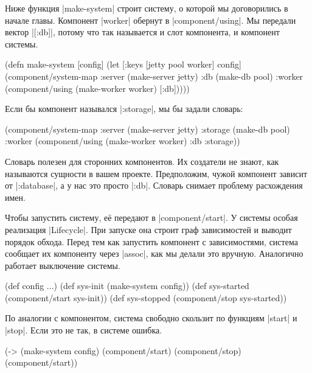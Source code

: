 Ниже функция \spverb|make-system| строит систему, о которой мы договорились в
начале главы. Компонент \spverb|worker| обернут в \spverb|component/using|. Мы
передали вектор \spverb|[:db]|, потому что так называется и слот компонента, и
компонент системы.

\begin{english}
  \begin{clojure}
(defn make-system
  [config]
  (let [{:keys [jetty pool worker]} config]
    (component/system-map
     :server (make-server jetty)
     :db     (make-db pool)
     :worker (component/using
              (make-worker worker) [:db]))))
  \end{clojure}
\end{english}

\noindent
Если бы компонент назывался \spverb|:storage|, мы бы задали словарь:

\begin{english}
  \begin{clojure}
(component/system-map
 :server  (make-server jetty)
 :storage (make-db pool)
 :worker  (component/using
           (make-worker worker) {:db :storage}))
  \end{clojure}
\end{english}

Словарь полезен для сторонних компонентов. Их создатели не знают, как называются
сущности в вашем проекте. Предположим, чужой компонент зависит от
\spverb|:database|, а у нас это просто \spverb|:db|. Словарь снимает проблему
расхождения имен.

Чтобы запустить систему, е\"{е} передают в \spverb|component/start|. У системы
особая реализация \spverb|Lifecycle|. При запуске она строит граф зависимостей и
выводит порядок обхода. Перед тем как запустить компонент с зависимостями,
система сообщает их компоненту через \spverb|assoc|, как мы делали это
вручную. Аналогично работает выключение системы.

\begin{english}
  \begin{clojure}
(def config {...})
(def sys-init (make-system config))
(def sys-started (component/start sys-init))
(def sys-stopped (component/stop sys-started))
  \end{clojure}
\end{english}

По аналогии с компонентом, система свободно скользит по функциям \spverb|start|
и \spverb|stop|. Если это не так, в системе ошибка.

\begin{english}
  \begin{clojure}
(-> (make-system config)
    (component/start)
    (component/stop)
    (component/start))
  \end{clojure}
\end{english}

